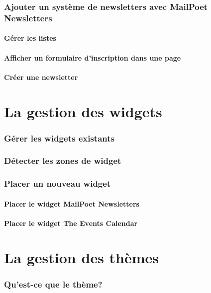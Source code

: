 \documentclass[10pt,a4paper]{article}
\begin{document}
\section{Ajouter un système de newsletters avec MailPoet Newsletters}
\subsection{Gérer les listes}
\subsection{Afficher un formulaire d'inscription dans une page}
\subsection{Créer une newsletter}
\newpage

\part{La gestion des widgets}
\newpage

\section{Gérer les widgets existants}
\newpage
\section{Détecter les zones de widget}
\newpage
\section{Placer un nouveau widget}
\subsection{Placer le widget MailPoet Newsletters}
\subsection{Placer le widget The Events Calendar}
\newpage

\part{La gestion des thèmes}
\newpage
\section{Qu'est-ce que le thème?}
\newpage
\end{document}
